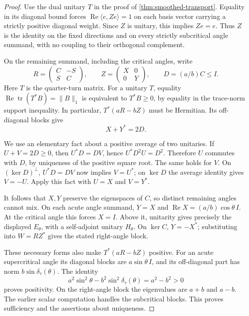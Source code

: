 \begin{proof}
Use the dual unitary $T$ in the proof of
\cref{thm:smoothed-transport}. Equality in its diagonal bound forces
$\operatorname{Re}\langle e,Ze\rangle=1$ on each basis vector carrying
a strictly positive diagonal weight. Since $Z$ is unitary, this implies
$Ze=e$. Thus $Z$ is the identity on the fixed directions and on every
strictly subcritical angle summand, with no coupling to their orthogonal
complement.

On the remaining summand, including the critical angles, write
\[
 R=\begin{pmatrix}C&-S\\S&C\end{pmatrix},\qquad
 Z=\begin{pmatrix}X&0\\0&Y\end{pmatrix},\qquad
 D=(a/b)C\leq I.
\]
Here $T$ is the quarter-turn matrix. For a unitary $T$, equality
$\operatorname{Re}\operatorname{tr}(T^*B)=\|B\|_1$ is equivalent to
$T^*B\geq0$, by equality in the trace-norm support inequality.
In particular, $T^*(aR-bZ)$ must be Hermitian. Its off-diagonal blocks
give
\begin{equation}
 X+Y^*=2D.
 \label{eq:smoothed-unitary-average}
\end{equation}

We use an elementary fact about a positive average of two unitaries.
If $U+V=2D\geq0$, then $U^*D=DV$, hence
$U^*D^2U=D^2$. Therefore $U$ commutes with $D$, by uniqueness of the
positive square root. The same holds for $V$. On $(\ker D)^\perp$,
$U^*D=DV$ now implies $V=U^*$; on $\ker D$ the average identity gives
$V=-U$. Apply this fact with $U=X$ and $V=Y^*$.

It follows that $X,Y$ preserve the eigenspaces of $C$, so distinct
remaining angles cannot mix. On each acute angle summand, $Y=X$ and
$\operatorname{Re}X=(a/b)\cos\theta\,I$. At the critical angle this
forces $X=I$. Above it, unitarity gives precisely the displayed
$E_\theta$, with a self-adjoint unitary $H_\theta$. On $\ker C$,
$Y=-X^*$; substituting into $W=RZ^*$ gives the stated right-angle block.

These necessary forms also make $T^*(aR-bZ)$ positive. For an acute
supercritical angle its diagonal blocks are $a\sin\theta\,I$, and
its off-diagonal part has norm $b\sin\delta_\tau(\theta)$. The identity
\[
 a^2\sin^2\theta-b^2\sin^2\delta_\tau(\theta)=a^2-b^2>0
\]
proves positivity. On the right-angle block the eigenvalues are $a+b$
and $a-b$. The earlier scalar computation handles the subcritical
blocks. This proves sufficiency and the assertions about uniqueness.
\end{proof}

